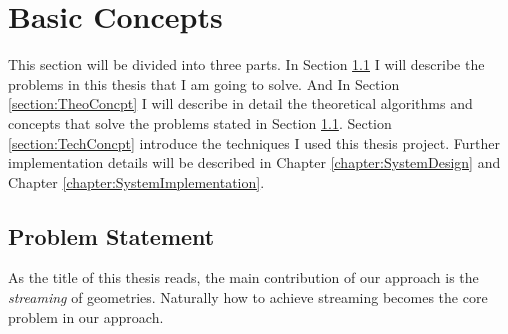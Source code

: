 \chapter{Basic Concepts}
\label{chapter:BasicConcepts}

This section will be divided into three parts. In Section \ref{section:ProbStat} I will describe the problems in this thesis that I am going to solve. And In Section \ref{section:TheoConcpt} I will describe in detail the theoretical algorithms and concepts that solve the problems stated in Section \ref{section:ProbStat}. Section \ref{section:TechConcpt} introduce the techniques I used this thesis project. Further implementation details will be described in Chapter \ref{chapter:SystemDesign} and Chapter \ref{chapter:SystemImplementation}. 

\section{Problem Statement}
\label{section:ProbStat}


As the title of this thesis reads, the main contribution of our approach is the \emph{streaming} of geometries. Naturally how to achieve streaming becomes the core problem in our approach. \\


